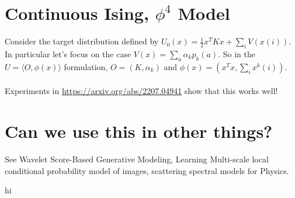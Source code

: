 \section{Continuous Ising, $\phi^4$ Model}
Consider the target distribution defined by $U_0(x) = \frac{1}{2} x^T K x + \sum_i V(x(i))$. In particular let's focus on the case $V(x) = \sum_a \alpha_k p_k(a)$. So in the $U = \langle O, \phi(x)\rangle$ formulation, $O = (K, \alpha_k)$ and $\phi(x) = (x^T x, \sum_i x^k(i))$. \\
\\
Experiments in \url{https://arxiv.org/abs/2207.04941} show that this works well!

\section{Can we use this in other things?}
See Wavelet Score-Based Generative Modeling, Learning Multi-scale local conditional probability model of images, scattering spectral models for Physics.









































\newpage
hi


